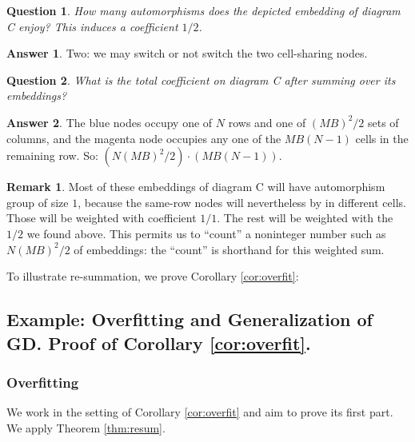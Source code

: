 \documentclass{article}
\theoremstyle{plain}
\newtheorem*{quest*}{Question}
\theoremstyle{definition}
\newtheorem*{answ*}{Answer}
\newtheorem*{rmk*}{Remark}
\begin{document}
            \begin{quest*}
                How many automorphisms does the depicted embedding of diagram C
                enjoy?
                This induces a coefficient $1/2$.
            \end{quest*}
            \begin{answ*}
                Two: we may switch or not switch the two cell-sharing nodes.
            \end{answ*}
            \begin{quest*}
                What is the total coefficient on diagram C after summing
                over its embeddings?
            \end{quest*}
            \begin{answ*}
                The blue nodes occupy one of $N$ rows and one of $(MB)^2/2$  
                sets of columns, and the magenta node occupies any one of the
                $MB(N-1)$ cells in the remaining row.  So:
                $(N(MB)^2/2) \cdot (MB(N-1))$.
            \end{answ*}
            \begin{rmk*}
                Most of these embeddings of diagram C will have automorphism
                group of size $1$, because the same-row nodes will nevertheless
                by in different cells.  Those will be weighted with coefficient
                $1/1$.  The rest will be weighted with the $1/2$ we found
                above.  This permits us to ``count'' a noninteger number such
                as $N(MB)^2/2$ of embeddings: the ``count'' is shorthand for
                this weighted sum.
            \end{rmk*}

            To illustrate re-summation, we prove Corollary
            \ref{cor:overfit}:

    \subsection{
        Example: Overfitting and Generalization of GD.  Proof of Corollary
        \ref{cor:overfit}. 
    }
        \subsubsection*{Overfitting}
            We work in the setting of Corollary \ref{cor:overfit} and aim to
            prove its first part.  We apply Theorem \ref{thm:resum}.  
\end{document}
